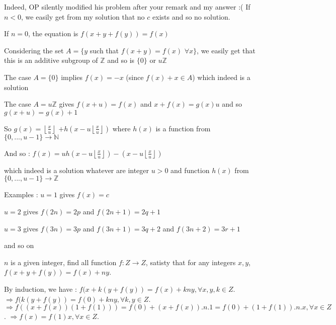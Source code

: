 \begin{solution}
	Indeed, OP silently modified his problem after your remark and my answer :(
If $n<0$, we easily get from my solution that no $c$ exists and so no solution.

If $n=0$, the equation is $f(x+y+f(y))=f(x)$

Considering the set $A=\{y$ such that $f(x+y)=f(x)$ $\forall x\}$, we easily get that this is an additive subgroup of $\mathbb Z$ and so is $\{0\}$ or $u\mathbb Z$

The case $A=\{0\}$ implies $\boxed{f(x)=-x}$ (since $f(x)+x\in A$) which indeed is a solution

The case $A=u\mathbb Z$ gives $f(x+u)=f(x)$ and $x+f(x)=g(x)u$ and so $g(x+u)=g(x)+1$

So $g(x)=\left\lfloor\frac xu\right\rfloor$ $+h\left(x-u\left\lfloor\frac xu\right\rfloor\right)$ where $h(x)$ is a function from $\{0,...,u-1\}\to\mathbb N$

And so :
$\boxed{f(x)=uh\left(x-u\left\lfloor\frac xu\right\rfloor\right)-\left(x-u\left\lfloor\frac xu\right\rfloor\right)}$

which indeed is a solution whatever are integer $u>0$ and function $h(x)$ from $\{0,...,u-1\}\to\mathbb Z$

Examples : 
$u=1$ gives $f(x)=c$

$u=2$ gives $f(2n)=2p$ and $f(2n+1)=2q+1$

$u=3$ gives $f(3n)=3p$ and $f(3n+1)=3q+2$ and $f(3n+2)=3r+1$

and so on
\end{solution}



\begin{solution}
	\begin{tcolorbox}$n$ is a given integer, find all function $f:Z \to Z$, satisty that for any integers $x,y$, $f\left( {x + y + f(y)} \right) = f(x) + ny$.\end{tcolorbox}
By induction, we have : $f(x+k(y+f(y))=f(x)+kny, \forall x,y,k\in Z$.
$\Rightarrow f(k(y+f(y))=f(0)+kny, \forall k,y\in Z$.
$\Rightarrow f((x+f(x))(1+f(1)))=f(0)+(x+f(x)).n.1=f(0)+(1+f(1)).n.x, \forall x\in Z$.
$\Rightarrow f(x)=f(1)x, \forall x\in Z$.
\end{solution}



